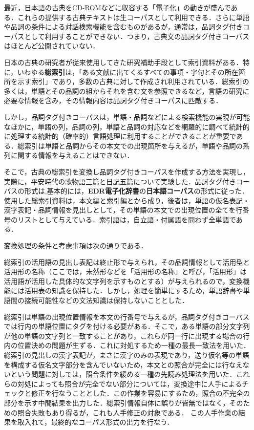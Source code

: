 最近，日本語の古典をCD-ROMなどに収容する「電子化」の動きが盛んである．これらの提供する古典テキストは生コーパスとして利用できる．さらに単語や品詞の条件による対話検索機能を含むものがあるが，通常は，品詞タグ付きコーパスとして利用することができない．つまり，古典文の品詞タグ付きコーパスはほとんど公開されていない．

日本の古典の研究者が従来使用してきた研究補助手段として索引資料がある．特に，いわゆる{\bf 総索引}は，「ある文献に出てくるすべての事項・字句とその所在箇所を示す索引」\cite{Nikkoku2001}であり，多数の古典に対して作成され利用されている\cite{Kobayashi2000}．総索引の多くは，単語とその品詞の組からそれを含む文を参照できるなど，言語の研究に必要な情報を含み，その情報内容は品詞タグ付きコーパスに匹敵する．

しかし，品詞タグ付きコーパスは，単語・品詞などによる検索機能\cite{Oota1997}\cite{EDR1999}\cite{Suzuki1999}の実現が可能なほかに，単語の列，品詞の列，単語と品詞の対応などを網羅的に調べて統計的に処理する統計的（確率的）言語処理\cite{Kita1996}に利用することができることが重要である．総索引は単語と品詞からその本文での出現箇所を与えるが，単語や品詞の系列に関する情報を与えることはできない．

そこで，古典の総索引を変換し品詞タグ付きコーパスを作成する方法を実現し，実際に，平安時代の歌物語三篇\cite{UTA1994}と日記五篇\cite{NIKKI1996}について実験した．品詞タグ付きコーパスの形式は,基本的には，{\bf EDR電子化辞書}の{\bf 日本語コーパス}\cite{EDR2001}の形式に従った．使用した総索引資料は，本文編と索引編とから成り，後者は，単語の仮名表記・漢字表記・品詞情報を見出しとして，その単語の本文での出現位置の全てを行番号のリストとして与えている．索引語は，自立語・付属語を問わず全単語である．

変換処理の条件と考慮事項は次の通りである．

総索引の活用語の見出し表記は終止形で与えられ，その品詞情報として活用型と活用形の名称（ここでは，未然形などを「活用形の名称」と呼び，「活用形」は活用語が活用した具体的な文字列を示すものとする）が与えられるので，変換機能には活用表の知識を保持した．しかし，処理を簡単にするため，単語辞書や単語間の接続可能性などの文法知識は保持しないこととした．

総索引は単語の出現位置情報を本文の行番号で与えるが，品詞タグ付きコーパスでは行内の単語位置にタグを付ける必要がある．そこで，ある単語の部分文字列が他の単語の文字列と一致することがあり，これらが同一行に出現する場合の行内の位置決めの問題が生ずる．これに対処するため一種の最長一致法を用いた．総索引の見出しの漢字表記が，まさに漢字のみの表現であり，送り仮名等の単語を構成する仮名文字部分を含んでいないため，本文との照合が完全には行なえないという問題に対しては，照合条件を緩める一種の先読み処理法を用いた．これらの対処によっても照合が完全でない部分については，変換途中に人手によるチェックと修正を行なうこととした．この作業を容易にするため，照合の不完全の部分を示す中間結果を出力した．総索引情報自体に誤りが皆無ではなく，そのための照合失敗もあり得るが，これも人手修正の対象である．
この人手作業の結果を取入れて，最終的なコーパス形式の出力を行なう．

